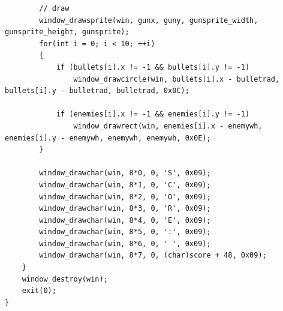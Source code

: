 \begin{appendices}
\begin{verbatim}
        // draw
        window_drawsprite(win, gunx, guny, gunsprite_width, gunsprite_height, gunsprite);
        for(int i = 0; i < 10; ++i)
        {
            if (bullets[i].x != -1 && bullets[i].y != -1)
                window_drawcircle(win, bullets[i].x - bulletrad, bullets[i].y - bulletrad, bulletrad, 0x0C);
            
            if (enemies[i].x != -1 && enemies[i].y != -1)
                window_drawrect(win, enemies[i].x - enemywh, enemies[i].y - enemywh, enemywh, enemywh, 0x0E);
        }

        window_drawchar(win, 8*0, 0, 'S', 0x09);
        window_drawchar(win, 8*1, 0, 'C', 0x09);
        window_drawchar(win, 8*2, 0, 'O', 0x09);
        window_drawchar(win, 8*3, 0, 'R', 0x09);
        window_drawchar(win, 8*4, 0, 'E', 0x09);
        window_drawchar(win, 8*5, 0, ':', 0x09);
        window_drawchar(win, 8*6, 0, ' ', 0x09);
        window_drawchar(win, 8*7, 0, (char)score + 48, 0x09);
    }
    window_destroy(win);
    exit(0);
}
\end{verbatim}

\end{appendices}
